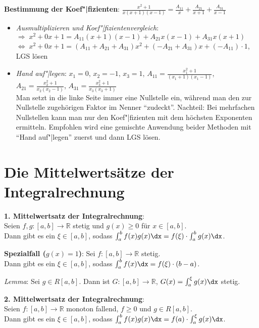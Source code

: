 \textbf{Bestimmung der Koef"|fizienten}:
$\frac{x^2 + 1}{x(x+1)(x-1)} = \frac{A_{11}}{x} + \frac{A_{21}}{x + 1} +
\frac{A_{31}}{x - 1}$
\begin{itemize}
   \item \emph{Ausmultiplizieren und Koef"|fizientenvergleich}: \\
   $\Rightarrow\; x^2 + 0x + 1 = A_{11}(x + 1)(x - 1) + A_{21}x(x - 1) +
   A_{31}x(x + 1)$ \\
   $\Leftrightarrow\; x^2 + 0x + 1 = (A_{11} + A_{21} + A_{31})x^2 +
   (-A_{21} + A_{31})x + (-A_{11}) \cdot 1$, \qquad
   LGS lösen

   \item \emph{Hand auf"|legen}:
   $x_1 = 0$, $x_2 = -1$, $x_3 = 1$,
   $A_{11} = \frac{x_1^2 + 1}{(x_1 + 1)(x_1 - 1)}$,
   $A_{21} = \frac{x_2^2 + 1}{x_2 (x_2 - 1)}$,
   $A_{31} = \frac{x_3^2 + 1}{x_3 (x_3 + 1)}$ \\
   Man setzt in die linke Seite immer eine Nullstelle ein, während
   man den zur Nullstelle zugehörigen Faktor im Nenner "`zudeckt"'.
   Nachteil: Bei mehrfachen Nullstellen kann man nur den Koef"|fizienten mit
   dem höchsten Exponenten ermitteln.
   Empfohlen wird eine gemischte Anwendung beider Methoden mit
   "`Hand auf"|legen"' zuerst und dann LGS lösen.
\end{itemize}

\section{%
    Die Mittelwertsätze der Integralrechnung%
}

\textbf{1. Mittelwertsatz der Integralrechnung}: \\
Seien $f, g: [a,b] \rightarrow \mathbb{R}$ stetig und $g(x) \ge 0$
für $x \in [a,b]$. \\
Dann gibt es ein $\xi \in [a,b]$, sodass
$\int_a^b f(x)g(x)\dx = f(\xi) \cdot \int_a^b g(x)\dx$.

\textbf{Spezialfall ($g(x) = 1$)}:
Sei $f: [a,b] \rightarrow \mathbb{R}$ stetig. \\
Dann gibt es ein $\xi \in [a,b]$, sodass
$\int_a^b f(x)\dx = f(\xi) \cdot (b-a)$.

\linie

\emph{Lemma}: Sei $g \in R[a,b]$.
Dann ist $G: [a,b] \rightarrow \mathbb{R}$, $G(x) = \int_a^\xi g(x)\dx$ stetig.

\textbf{2. Mittelwertsatz der Integralrechnung}: \\
Seien $f: [a,b] \rightarrow \mathbb{R}$ monoton fallend, $f \ge 0$
und $g \in R[a,b]$. \\
Dann gibt es ein $\xi \in [a,b]$, sodass
$\int_a^b f(x)g(x)\dx = f(a) \cdot \int_a^\xi g(x)\dx$.

